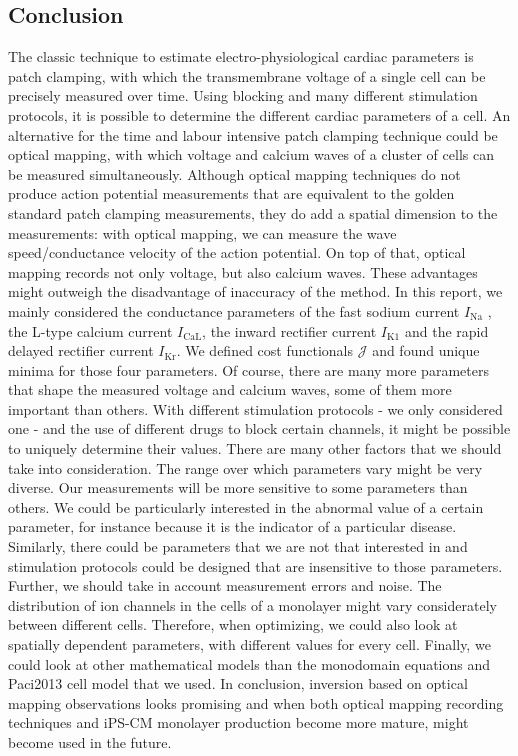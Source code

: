 \documentclass{article}
\begin{document}
\subsection{Conclusion} \label{Conclusion}
The classic technique to estimate electro-physiological cardiac parameters is patch clamping, with which the transmembrane voltage of a single cell can be precisely measured over time. Using blocking and many different stimulation protocols, it is possible to determine the different cardiac parameters of a cell. An alternative for the time and labour intensive patch clamping technique could be optical mapping, with which voltage and calcium waves of a cluster of cells can be measured simultaneously. Although optical mapping techniques do not produce action potential measurements that are equivalent to the golden standard patch clamping measurements, they do add a spatial dimension to the measurements: with optical mapping, we can measure the wave speed/conductance velocity of the action potential. On top of that, optical mapping records not only voltage, but also calcium waves. These advantages might outweigh the disadvantage of inaccuracy of the method. In this report, we mainly considered the conductance parameters of the fast sodium current $I_{\mathrm{Na}}$ , the L-type calcium current $I_{\mathrm{CaL}}$, the inward rectifier current $I_{\mathrm{K1}}$ and the rapid delayed rectifier current $I_{\mathrm{Kr}}$. We defined cost functionals $\mathcal{J}$ and found unique minima for those four parameters. Of course, there are many more parameters that shape the measured voltage and calcium waves, some of them more important than others. With different stimulation protocols - we only considered one - and the use of different drugs to block certain channels, it might be possible to uniquely determine their values. There are many other factors that we should take into consideration. The range over which parameters vary might be very diverse. Our measurements will be more sensitive to some parameters than others. We could be particularly interested in the abnormal value of a certain parameter, for instance because it is the indicator of a particular disease. Similarly, there could be parameters that we are not that interested in and stimulation protocols could be designed that are insensitive to those parameters. Further, we should take in account measurement errors and noise. The distribution of ion channels in the cells of a monolayer might vary considerately between different cells. Therefore, when optimizing, we could also look at spatially dependent parameters, with different values for every cell. Finally, we could look at other mathematical models than the monodomain equations and Paci2013 cell model that we used. In conclusion, inversion based on optical mapping observations looks promising and when both optical mapping recording techniques and iPS-CM monolayer production become more mature, might become used in the future.


%
\end{document}
